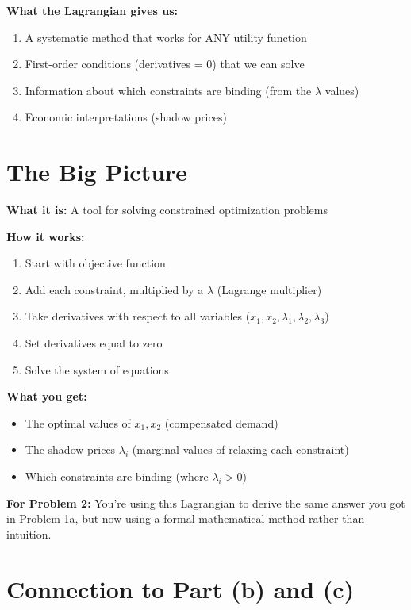 \documentclass[11pt]{article}
\begin{document}
\textbf{What the Lagrangian gives us:}
\begin{enumerate}
\item A systematic method that works for ANY utility function
\item First-order conditions (derivatives = 0) that we can solve
\item Information about which constraints are binding (from the $\lambda$ values)
\item Economic interpretations (shadow prices)
\end{enumerate}

\section{The Big Picture}

\begin{tcolorbox}[colback=blue!5!white,colframe=blue!75!black,title=Understanding Lagrangians]
\textbf{What it is:} A tool for solving constrained optimization problems

\textbf{How it works:}
\begin{enumerate}
\item Start with objective function
\item Add each constraint, multiplied by a $\lambda$ (Lagrange multiplier)
\item Take derivatives with respect to all variables ($x_1, x_2, \lambda_1, \lambda_2, \lambda_3$)
\item Set derivatives equal to zero
\item Solve the system of equations
\end{enumerate}

\textbf{What you get:}
\begin{itemize}
\item The optimal values of $x_1, x_2$ (compensated demand)
\item The shadow prices $\lambda_i$ (marginal values of relaxing each constraint)
\item Which constraints are binding (where $\lambda_i > 0$)
\end{itemize}

\textbf{For Problem 2:} You're using this Lagrangian to derive the same answer you got in Problem 1a, but now using a formal mathematical method rather than intuition.
\end{tcolorbox}

\section{Connection to Part (b) and (c)}
\end{document}
